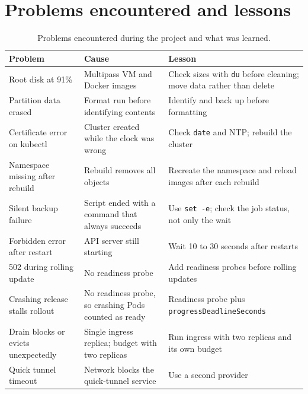 \documentclass[11pt,a4paper]{article}
\begin{document}
\section{Problems encountered and lessons}
\begin{table}[H]
\centering
\small
\begin{tabular}{@{}p{4.3cm}p{5.3cm}p{5.4cm}@{}}
\toprule
Problem & Cause & Lesson \\
\midrule
Root disk at 91\% & Multipass VM and Docker images & Check sizes with \texttt{du} before cleaning; move data rather than delete \\
Partition data erased & Format run before identifying contents & Identify and back up before formatting \\
Certificate error on kubectl & Cluster created while the clock was wrong & Check \texttt{date} and NTP; rebuild the cluster \\
Namespace missing after rebuild & Rebuild removes all objects & Recreate the namespace and reload images after each rebuild \\
Silent backup failure & Script ended with a command that always succeeds & Use \texttt{set -e}; check the job status, not only the wait \\
Forbidden error after restart & API server still starting & Wait 10 to 30 seconds after restarts \\
502 during rolling update & No readiness probe & Add readiness probes before rolling updates \\
Crashing release stalls rollout & No readiness probe, so crashing Pods counted as ready & Readiness probe plus \texttt{progressDeadlineSeconds} \\
Drain blocks or evicts unexpectedly & Single ingress replica; budget with two replicas & Run ingress with two replicas and its own budget \\
Quick tunnel timeout & Network blocks the quick-tunnel service & Use a second provider \\
\bottomrule
\end{tabular}
\caption{Problems encountered during the project and what was learned.}
\end{table}
\end{document}
